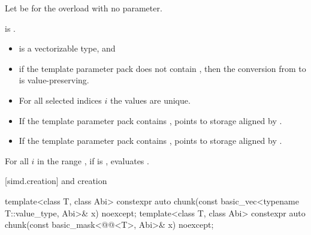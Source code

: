 \begin{itemdescr}
\pnum
Let  be  for the overload with
no  parameter.

\pnum
\constraints
{} is .

\pnum
\mandates
\begin{itemize}
\item
{} is a vectorizable type, and
\item
if the template parameter pack  does not contain ,
then the conversion from 
to  is value-preserving.
\end{itemize}

\pnum
\expects
\begin{itemize}
\item
For all selected indices $i$ the values  are unique.
\item
If the template parameter pack  contains ,
 points to storage aligned by
.
\item
If the template parameter pack  contains
,
 points to storage aligned by .
\end{itemize}

\pnum
\effects
For all $i$ in the range , if  is , evaluates
.
\end{itemdescr}

[simd.creation]{ and  creation}

\begin{itemdecl}
template<class T, class Abi>
  constexpr auto chunk(const basic_vec<typename T::value_type, Abi>& x) noexcept;
template<class T, class Abi>
  constexpr auto chunk(const basic_mask<@@<T>, Abi>& x) noexcept;
\end{itemdecl}

